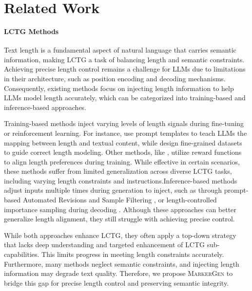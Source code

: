 \section{Related Work}
\label{sec:related work}


\paragraph{LCTG Methods}
Text length is a fundamental aspect of natural language that carries semantic information, making LCTG a task of balancing length and semantic constraints. Achieving precise length control remains a challenge for LLMs due to limitations in their architecture, such as position encoding \citep{butcher2024precise,kazemnejad2024impact,chang2024language} and decoding mechanisms\citep{huang2025decoding}. Consequently, existing methods focus on injecting length information to help LLMs model length accurately, which can be categorized into training-based and inference-based approaches.

Training-based methods inject varying levels of length signals during fine-tuning or reinforcement learning. For instance, \citet{promptRein, ruler} use prompt templates to teach LLMs the mapping between length and textual content, while \citet{song2024hansel, wang2024positionid} design fine-grained datasets to guide correct length modeling. Other methods, like \citet{lift, promptRein}, utilize reward functions to align length preferences during training. While effective in certain scenarios, these methods suffer from limited generalization across diverse LCTG tasks, including varying length constraints and instructions.Inference-based methods adjust inputs multiple times during generation to inject, such as through prompt-based Automated Revisions and Sample Filtering \citep{retkowski2024zero,juseon2024instructcmp}, or length-controlled importance sampling during decoding \citep{gu2024length}. Although these approaches can better generalize length alignment, they still struggle with achieving precise control.

While both approaches enhance LCTG, they often apply a top-down strategy that lacks deep understanding and targeted enhancement of LCTG sub-capabilities. This limits progress in meeting length constraints accurately. Furthermore, many methods neglect semantic constraints, and injecting length information may degrade text quality. Therefore, we propose \textsc{MarkerGen} to bridge this gap for precise length control and preserving semantic integrity.